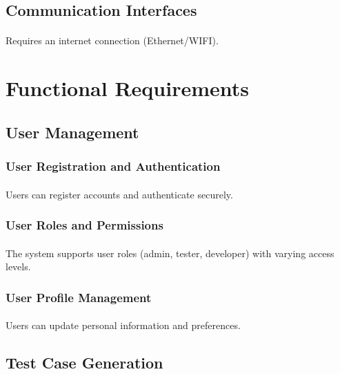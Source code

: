 \documentclass{article}
\begin{document}
\subsection{Communication Interfaces}
\paragraph{}
Requires an internet connection (Ethernet/WIFI).


\section{Functional Requirements}

\subsection{User Management}
\subsubsection{User Registration and Authentication}
\paragraph{}
Users can register accounts and authenticate securely.

\subsubsection{User Roles and Permissions}
\paragraph{}
The system supports user roles (admin, tester, developer) with varying access levels.

\subsubsection{User Profile Management}
\paragraph{}
Users can update personal information and preferences.

\subsection{Test Case Generation}
\end{document}
